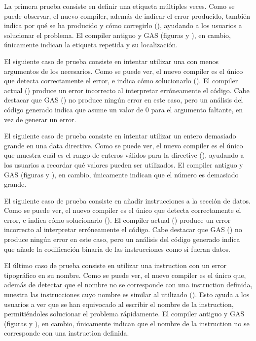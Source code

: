 La primera prueba consiste en definir una etiqueta múltiples veces. \evalresref
Como se puede observar, el nuevo \gls{compiler}, además de indicar el error
producido, también indica por qué se ha producido y cómo corregirlo
(), ayudando a los usuarios a solucionar el problema. El
\gls{compiler} antiguo y \gls{GAS} (figuras  y ), en
cambio, únicamente indican la etiqueta repetida y su localización.

\evalres

El siguiente caso de prueba consiste en intentar utilizar una
 con menos argumentos de los necesarios.
\evalresref Como se puede ver, el nuevo \gls{compiler} es el único que detecta
correctamente el error, e indica cómo solucionarlo (). El
\gls{compiler} actual () produce un error incorrecto al
interpretar erróneamente el código. Cabe destacar que \gls{GAS}
() no produce ningún error en este caso, pero un análisis del
código generado indica que asume un valor de 0 para el argumento faltante, en vez
de generar un error.

\evalres

El siguiente caso de prueba consiste en intentar utilizar un entero demasiado
grande en una \gls{data directive}. \evalresref Como se puede ver, el nuevo
\gls{compiler} es el único que muestra cuál es el rango de enteros válidos para
la \gls{directive} (), ayudando a los usuarios a recordar qué
valores pueden ser utilizados. El \gls{compiler} antiguo y \gls{GAS} (figuras
 y ), en cambio, únicamente indican que el número es
demasiado grande.

\evalres

El siguiente caso de prueba consiste en añadir instrucciones a la sección de
datos. \evalresref Como se puede ver, el nuevo \gls{compiler} es el único que
detecta correctamente el error, e indica cómo solucionarlo ().
El \gls{compiler} actual () produce un error incorrecto al
interpretar erróneamente el código. Cabe destacar que \gls{GAS}
() no produce ningún error en este caso, pero un análisis del
código generado indica que añade la codificación binaria de las instrucciones
como si fueran datos.

\evalres

El último caso de prueba consiste en utilizar una \gls{instruction} con un error
tipográfico en su nombre. \evalresref Como se puede ver, el nuevo \gls{compiler}
es el único que, además de detectar que el nombre no se corresponde con una
\gls{instruction} definida, muestra las instrucciones cuyo nombre es similar al
utilizado (). Esto ayuda a los usuarios a ver que se han
equivocado al escribir el nombre de la \gls{instruction}, permitiéndoles
solucionar el problema rápidamente. El \gls{compiler} antiguo y \gls{GAS}
(figuras  y ), en cambio, únicamente indican que el
nombre de la \gls{instruction} no se corresponde con una \gls{instruction}
definida.

